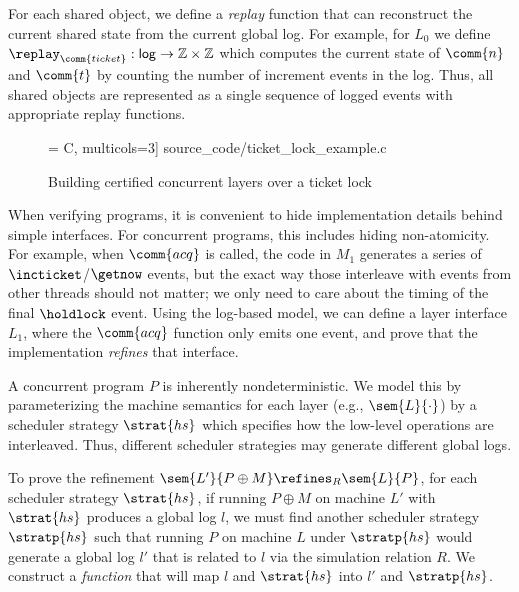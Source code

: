 For each shared object, we define a {\em replay} function that can
reconstruct the current shared state from the current global
log. For example, for $L_0$ we define $\replay_{\comm{ticket}} :
\mathsf{log} \rightarrow \mathbb{Z}\times\mathbb{Z}$ which computes
the current state of $\comm{n}$ and $\comm{t}$ by counting the
number of increment events in the log.
Thus, all shared objects are represented as a single sequence of
logged events with appropriate replay functions.

\begin{figure*}
 = C, multicols=3] {source_code/ticket_lock_example.c}
\vspace{-15pt}
\caption{Building certified concurrent layers over a ticket lock}
\label{fig:exp:ticket_lock_example}
\vspace{-15pt}
\end{figure*}


When verifying programs, it is convenient to hide implementation
details behind simple interfaces. For concurrent programs, this includes hiding
non-atomicity. For example, when $\comm{acq}$ is called, the code in
$M_1$ generates a series of $\incticket$/$\getnow$ events,
but the exact way those interleave with events from other threads
should not matter; we only need to care about the timing of the
final $\holdlock$ event.  Using the log-based model, we can
define a layer interface $L_1$, where the $\comm{acq}$ function only emits one
event, and prove that the implementation \emph{refines} that
interface.

A concurrent program $P$ is inherently nondeterministic. We model this
by parameterizing the machine semantics for each layer (e.g.,
$\sem{L}{\cdot}$) by a scheduler strategy $\strat{hs}$ which specifies
how the low-level operations are interleaved.  Thus, different
scheduler strategies may generate different global logs.

To prove the refinement $\sem{L'}{P\oplus{}M} \refines_R \sem{L}{P}$,
for each scheduler strategy $\strat{hs}$, if running $P\oplus{}M$ on
machine $L'$ with $\strat{hs}$ produces a global log $l$, we must find
another scheduler strategy $\stratp{hs}$ such that running $P$ on
machine $L$ under $\stratp{hs}$ would generate a global log $l'$ that
is related to $l$ via the simulation relation $R$. We 
construct a {\em function} that will map $l$ and $\strat{hs}$ into
$l'$ and $\stratp{hs}$.

